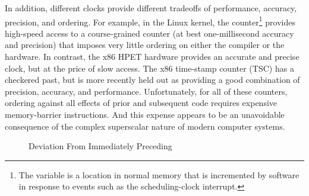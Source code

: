 In addition, different clocks provide different tradeoffs of performance,
accuracy, precision, and ordering.
For example, in the Linux kernel, the  counter\footnote{
	The  variable is a location in normal memory that
	is incremented by software in response to events such as the
	scheduling-clock interrupt.}
provides high-speed access to a course-grained counter (at best
one-millisecond accuracy and precision) that imposes very little ordering
on either the compiler or the hardware.
In contrast, the x86 HPET hardware provides an accurate and
precise clock, but at the price of slow access.
The x86 time-stamp counter (TSC) has a checkered past, but is more
recently held out as providing a good combination of precision, accuracy,
and performance.
Unfortunately, for all of these counters, ordering against all effects
of prior and subsequent code requires expensive memory-barrier instructions.
And this expense appears to be an unavoidable consequence of the
complex superscalar nature of modern computer systems.

\QuickQuizEnd

\begin{figure}
\centering
{}
\caption{ Deviation From Immediately Preceding }
\label{fig:app:questions:clock-gettime(CLOCK-REALTIME) Deviation From Immediately Preceding clock-gettime(CLOCK-MONOTONIC)}
\end{figure}

